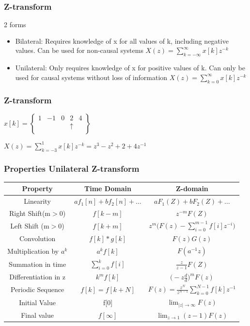\begin{frame}
	\frametitle{Z-transform}
	\begin{block}{2 forms}
			\begin{itemize}
				
				\item Bilateral:
				Requires knowledge of x for all values of k, including negative values.
				Can be used for non-causal systems $X(z) = \sum\limits_{k=-\infty}^{\infty} x[k]z^{-k}$
				\item 	Unilateral:
				Only requires knowledge of x for positive values of k.
				Can only be used for causal systems without loss of information $X(z) = \sum\limits_{k=0}^{\infty} x[k]z^{-k}$
			\end{itemize}
	\end{block}


\end{frame}
\begin{frame}
	\frametitle{Z-transform}
		\begin{example}
			\begin{center}
				
				$x[k] = \begin{Bmatrix}
				1 & - 1 & 0 & 2 & 4\\
				&     &   & \uparrow & \\
				\end{Bmatrix}$
			\end{center}
			\begin{center}
				$X(z) = \sum\limits_{k=-3}^{1}x[k]z^{-k} = z^3 -z^2 +2 + 4z^{-1}$
			\end{center}
		\end{example}	
\end{frame}
\begin{frame}
	\frametitle{Properties Unilateral Z-transform}
	\small{
		\begin{tabular}{|c|c|c|}
			\hline  Property & Time Domain & Z-domain  \\ 
			\hline  Linearity & $af_1[n]+bf_2[n] + \dots  $& $aF_1(Z)+bF_2(Z)+\dots$ \\ 
			\hline  Right Shift(m$>$0)& $f[k-m]$  &$z^{-m}F(Z)$  \\ 
			\hline  Left Shift (m$>$0)& $f[k+m] $  & $ z^m\bigg(F(z)-\sum\limits_{i=0}^{m-1}f[i]z^{-i} \bigg)$ \\ 
			\hline  Convolution & $f[k]\ast g[k] $  & $F(z)G(z) $ \\ 
			\hline  Multiplication by $a^{k}$ & $a^{k}f[k]$  & $F(a^{-1}z)$  \\ 
			\hline  Summation in time& $\sum\limits_{i=0}^{k}f[i]$  & $\frac{z}{z-1}F(Z) $\\ 
			\hline  Differentiation in z& $k^mf[k]$ & $\big(-z \frac{d}{d}\big)^{m} F(z)$ \\ 
			\hline  Periodic Sequence & $f[k] = f[k+N]$  & $F(z) = \frac{z^N}{z^{N-1}}\sum\limits_{k=0}^{N-1}f[k]z^{-1}$  \\ 
			\hline  Initial Value& f[0] &$ \lim_{\mid z \mid \to \infty} F(z) $  \\ 
			\hline  Final value & $f[\infty] $ & $\lim_{z \to 1} (z-1)F(z) $ \\ 
			\hline 
		\end{tabular} }
\end{frame}
